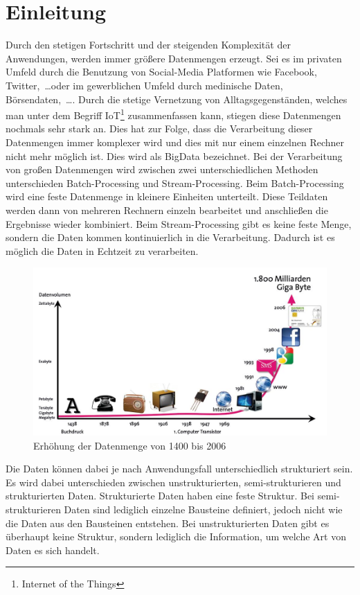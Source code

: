 \chapter{Einleitung}
Durch den stetigen Fortschritt und der steigenden Komplexität der Anwendungen,
werden immer größere Datenmengen erzeugt. Sei es im privaten Umfeld durch die
Benutzung von Social-Media Platformen wie Facebook, Twitter,~\dots oder im gewerblichen
Umfeld durch medinische Daten, Börsendaten,~\dots . Durch die stetige Vernetzung
von Alltagsgegenständen, welches man unter dem Begriff IoT\footnote{Internet of the Things}
zusammenfassen kann, stiegen diese Datenmengen nochmals sehr stark an. Dies hat
zur Folge, dass die Verarbeitung dieser Datenmengen immer komplexer wird und dies
mit nur einem einzelnen Rechner nicht mehr möglich ist. Dies wird als \gls{BigData}
bezeichnet. Bei der Verarbeitung von großen Datenmengen wird zwischen zwei
unterschiedlichen Methoden unterschieden Batch-Processing und Stream-Processing.
Beim Batch-Processing wird eine feste Datenmenge in kleinere Einheiten unterteilt.
Diese Teildaten werden dann von mehreren Rechnern einzeln bearbeitet und
anschließen die Ergebnisse wieder kombiniert. Beim Stream-Processing gibt es
keine feste Menge, sondern die Daten kommen kontinuierlich in die Verarbeitung.
Dadurch ist es möglich die Daten in Echtzeit zu verarbeiten.

\begin{figure}
\centering
\includegraphics[scale=0.375]{../material/images/bitkom-lf-bigdata-2012-data_grow.jpg}
\caption{Erhöhung der Datenmenge von 1400 bis 2006 \parencite{Weber2012}}
\label{fig:data-grow}
\end{figure}

Die Daten können dabei je nach Anwendungsfall unterschiedlich strukturiert sein.
Es wird dabei unterschieden zwischen unstrukturierten, semi-strukturieren
und strukturierten Daten. Strukturierte Daten haben eine feste Struktur. Bei
semi-strukturieren Daten sind lediglich einzelne Bausteine definiert,
jedoch nicht wie die Daten aus den Bausteinen entstehen. Bei unstrukturierten
Daten gibt es überhaupt keine Struktur, sondern lediglich die Information, um
welche Art von Daten es sich handelt.

